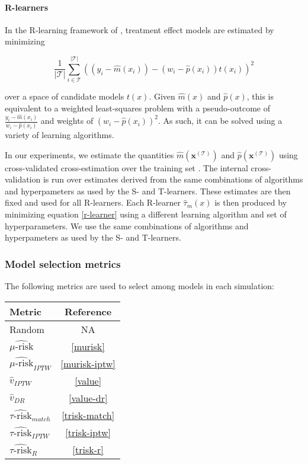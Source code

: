 \paragraph{R-learners} In the R-learning framework of \citet{Nie:2017vi}, treatment effect models are estimated by minimizing 

\begin{equation}
	\frac{1}{|\mathcal{T}|}\sum_{i \in \mathcal{T}}^{|\mathcal{T}|}  
	((y_i - \hat m(x_i)) - (w_i - \hat p(x_i))t(x_i))^2
\label{r-learner}
\end{equation}

over a space of candidate models $t(x)$. Given $\hat m(x)$ and $\hat p(x)$, this is equivalent to a weighted least-squares problem with a pseudo-outcome of $\frac{ y_i - \hat m(x_i) }{w_i - \hat p(x_i)}$ and weights of $(w_i - \hat p(x_i))^2$. As such, it can be solved using a variety of learning algorithms. 

In our experiments, we estimate the quantities $\hat m(\bm x^{(\mathcal T)})$ and $\hat p(\bm x^{(\mathcal T)})$ using cross-validated cross-estimation over the training set \cite{Nie:2017vi, Wager:2016dz}. The internal cross-validation is run over estimates derived from the same combinations of algorithms and hyperpameters as used by the S- and T-learners. These estimates are then fixed and used for all R-learners. Each R-learner $\hat\tau_m(x)$ is then produced by minimizing equation \ref{r-learner} using a different learning algorithm and set of hyperparameters. We use the same combinations of algorithms and hyperpameters as used by the S- and T-learners.

\subsubsection{Model selection metrics}

The following metrics are used to select among models in each simulation:


\begin{center}
\tabulinesep=1mm
\begin{tabu}{|l|c|}
	\hline
	 \rowfont[c]{\bfseries} Metric & Reference  \\
	 \hline
	 Random 						& NA  \\
	 $\widehat{\mu\text{-risk}}$		& \ref{murisk}  \\
	 $\widehat{\mu\text{-risk}}_{IPTW}$	& \ref{murisk-iptw} \\
	 $\hat v_{IPTW}$ 				& \ref{value}  \\
	 $\hat v_{DR}$					& \ref{value-dr} \\
	 $\widehat{\tau\text{-risk}}_{match}$	& \ref{trisk-match} \\
	 $\widehat{\tau\text{-risk}}_{IPTW}$ 	& \ref{trisk-iptw} \\
	 $\widehat{\tau\text{-risk}}_{R}$		& \ref{trisk-r} \\
	 \hline
\end{tabu}
\end{center}


